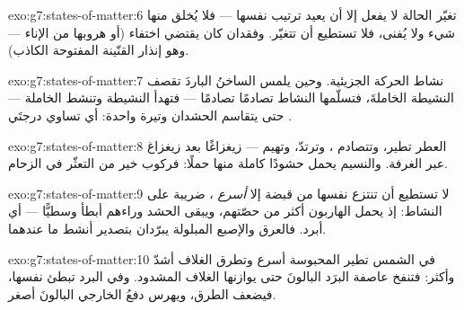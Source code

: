 \begin{solution}{exo:g7:states-of-matter:6}
تغيّر الحالة لا يفعل إلا أن يعيد ترتيب  نفسها --- فلا
يُخلق منها شيء ولا يُفنى، فلا تستطيع  أن تتغيّر. وفقدان
 كان يقتضي اختفاء  (أو هروبها من الإناء --- وهو
إنذار القنّينة المفتوحة الكاذب).
\end{solution}

\begin{solution}{exo:g7:states-of-matter:7}
 نشاط الحركة الجزيئية. وحين يلمس الساخنُ الباردَ تقصف
 النشيطة الخاملةَ، فتسلّمها النشاط تصادمًا تصادمًا ---
فتهدأ النشيطة وتنشط الخاملة --- حتى يتقاسم الحشدان وتيرة
واحدة: أي تساوي درجتَي .
\end{solution}

\begin{solution}{exo:g7:states-of-matter:8}
 العطر تطير، وتتصادم  ، وترتدّ، وتهيم ---
زيغزاغًا بعد زيغزاغ عبر الغرفة. والنسيم يحمل حشودًا كاملة منها
حملًا: فركوب  خير من التعثّر في الزحام.
\end{solution}

\begin{solution}{exo:g7:states-of-matter:9}
لا تستطيع أن تنتزع نفسها من قبضة  إلا \emph{أسرع}
،  ضريبة على النشاط: إذ يحمل الهاربون أكثر من
حصّتهم، ويبقى الحشد وراءهم أبطأ وسطيًّا --- أي أبرد. فالعرق
والإصبع المبلولة يبرّدان بتصدير أنشط ما عندهما.
\end{solution}

\begin{solution}{exo:g7:states-of-matter:10}
في الشمس تطير  المحبوسة أسرع وتطرق الغلاف أشدّ وأكثر:
فتنفخ عاصفة البرَد البالونَ حتى يوازنها الغلاف المشدود. وفي
البرد تبطئ  نفسها، فيضعف الطرق، ويهرس دفعُ 
الخارجي البالونَ أصغر.
\end{solution}

